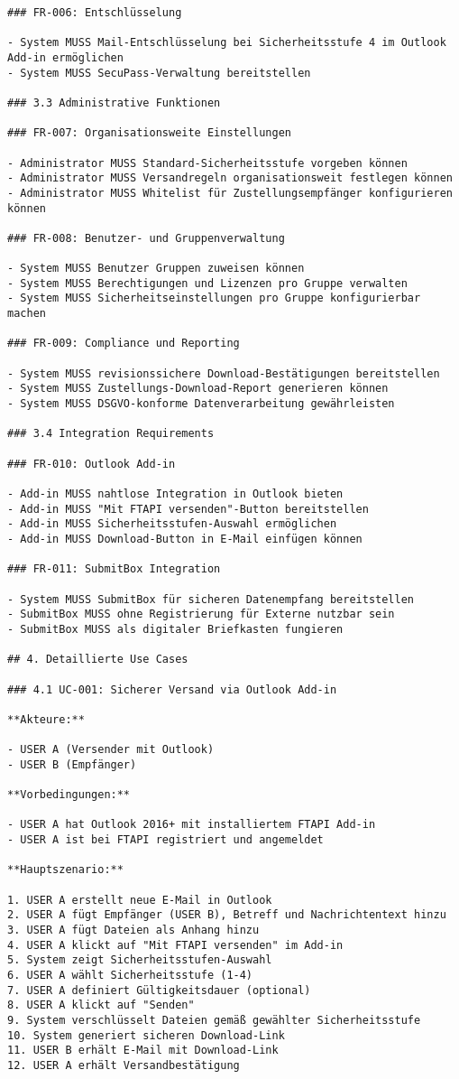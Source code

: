\begin{verbatim}
### FR-006: Entschlüsselung

- System MUSS Mail-Entschlüsselung bei Sicherheitsstufe 4 im Outlook Add-in ermöglichen
- System MUSS SecuPass-Verwaltung bereitstellen

### 3.3 Administrative Funktionen

### FR-007: Organisationsweite Einstellungen

- Administrator MUSS Standard-Sicherheitsstufe vorgeben können
- Administrator MUSS Versandregeln organisationsweit festlegen können
- Administrator MUSS Whitelist für Zustellungsempfänger konfigurieren können

### FR-008: Benutzer- und Gruppenverwaltung

- System MUSS Benutzer Gruppen zuweisen können
- System MUSS Berechtigungen und Lizenzen pro Gruppe verwalten
- System MUSS Sicherheitseinstellungen pro Gruppe konfigurierbar machen

### FR-009: Compliance und Reporting

- System MUSS revisionssichere Download-Bestätigungen bereitstellen
- System MUSS Zustellungs-Download-Report generieren können
- System MUSS DSGVO-konforme Datenverarbeitung gewährleisten

### 3.4 Integration Requirements

### FR-010: Outlook Add-in

- Add-in MUSS nahtlose Integration in Outlook bieten
- Add-in MUSS "Mit FTAPI versenden"-Button bereitstellen
- Add-in MUSS Sicherheitsstufen-Auswahl ermöglichen
- Add-in MUSS Download-Button in E-Mail einfügen können

### FR-011: SubmitBox Integration

- System MUSS SubmitBox für sicheren Datenempfang bereitstellen
- SubmitBox MUSS ohne Registrierung für Externe nutzbar sein
- SubmitBox MUSS als digitaler Briefkasten fungieren

## 4. Detaillierte Use Cases

### 4.1 UC-001: Sicherer Versand via Outlook Add-in

**Akteure:**

- USER A (Versender mit Outlook)
- USER B (Empfänger)

**Vorbedingungen:**

- USER A hat Outlook 2016+ mit installiertem FTAPI Add-in
- USER A ist bei FTAPI registriert und angemeldet

**Hauptszenario:**

1. USER A erstellt neue E-Mail in Outlook
2. USER A fügt Empfänger (USER B), Betreff und Nachrichtentext hinzu
3. USER A fügt Dateien als Anhang hinzu
4. USER A klickt auf "Mit FTAPI versenden" im Add-in
5. System zeigt Sicherheitsstufen-Auswahl
6. USER A wählt Sicherheitsstufe (1-4)
7. USER A definiert Gültigkeitsdauer (optional)
8. USER A klickt auf "Senden"
9. System verschlüsselt Dateien gemäß gewählter Sicherheitsstufe
10. System generiert sicheren Download-Link
11. USER B erhält E-Mail mit Download-Link
12. USER A erhält Versandbestätigung


\end{verbatim}
